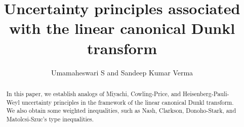\documentclass[12pt,a4paper,reqno]{amsproc}
\theoremstyle{definition}
\theoremstyle{remark}
\numberwithin{equation}{section}
\begin{document}
\setcounter{page}{1}

\title[Uncertainty principles associated with LCDT]
 {Uncertainty principles associated with the  linear canonical Dunkl transform}
 
\author[Umamaheswari S and Sandeep Kumar Verma]{Umamaheswari S and Sandeep Kumar Verma}

\address{Department of Mathematics, SRM University-AP, Andhra Pradesh, Guntur--522502, India}


 


\maketitle
\begin{abstract} 
In this paper, we establish analogs of Miyachi, Cowling-Price, and Heisenberg-Pauli-Weyl uncertainty principles in the framework of the linear canonical Dunkl transform. We also obtain some weighted inequalities, such as Nash, Clarkson, Donoho-Stark, and Matolcsi-Szuc’s type inequalities.
\end{abstract}
\end{document}
